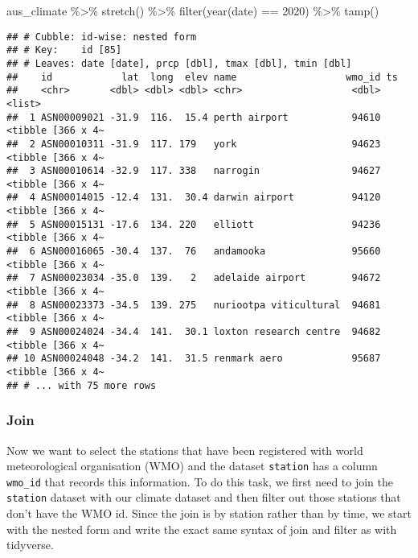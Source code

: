 \documentclass{article}
\newenvironment{Shaded}{\begin{snugshade}}{\end{snugshade}}
\newcommand{\DecValTok}[1]{\textcolor[rgb]{0.00,0.00,0.81}{#1}}
\newcommand{\FunctionTok}[1]{\textcolor[rgb]{0.00,0.00,0.00}{#1}}
\newcommand{\NormalTok}[1]{#1}
\newcommand{\SpecialCharTok}[1]{\textcolor[rgb]{0.00,0.00,0.00}{#1}}
\begin{document}
\begin{Shaded}
\begin{Highlighting}[]
\NormalTok{aus\_climate }\SpecialCharTok{\%\textgreater{}\%} 
  \FunctionTok{stretch}\NormalTok{() }\SpecialCharTok{\%\textgreater{}\%} 
  \FunctionTok{filter}\NormalTok{(}\FunctionTok{year}\NormalTok{(date) }\SpecialCharTok{==} \DecValTok{2020}\NormalTok{) }\SpecialCharTok{\%\textgreater{}\%} 
  \FunctionTok{tamp}\NormalTok{()}
\end{Highlighting}
\end{Shaded}

\begin{verbatim}
## # Cubble: id-wise: nested form
## # Key:    id [85]
## # Leaves: date [date], prcp [dbl], tmax [dbl], tmin [dbl]
##    id            lat  long  elev name                   wmo_id ts               
##    <chr>       <dbl> <dbl> <dbl> <chr>                   <dbl> <list>           
##  1 ASN00009021 -31.9  116.  15.4 perth airport           94610 <tibble [366 x 4~
##  2 ASN00010311 -31.9  117. 179   york                    94623 <tibble [366 x 4~
##  3 ASN00010614 -32.9  117. 338   narrogin                94627 <tibble [366 x 4~
##  4 ASN00014015 -12.4  131.  30.4 darwin airport          94120 <tibble [366 x 4~
##  5 ASN00015131 -17.6  134. 220   elliott                 94236 <tibble [366 x 4~
##  6 ASN00016065 -30.4  137.  76   andamooka               95660 <tibble [366 x 4~
##  7 ASN00023034 -35.0  139.   2   adelaide airport        94672 <tibble [366 x 4~
##  8 ASN00023373 -34.5  139. 275   nuriootpa viticultural  94681 <tibble [366 x 4~
##  9 ASN00024024 -34.4  141.  30.1 loxton research centre  94682 <tibble [366 x 4~
## 10 ASN00024048 -34.2  141.  31.5 renmark aero            95687 <tibble [366 x 4~
## # ... with 75 more rows
\end{verbatim}

\hypertarget{join}{%
\subsubsection{Join}\label{join}}

Now we want to select the stations that have been registered with world
meteorological organisation (WMO) and the dataset \texttt{station} has a
column \texttt{wmo\_id} that records this information. To do this task,
we first need to join the \texttt{station} dataset with our climate
dataset and then filter out those stations that don't have the WMO id.
Since the join is by station rather than by time, we start with the
nested form and write the exact same syntax of join and filter as with
tidyverse.
\end{document}
